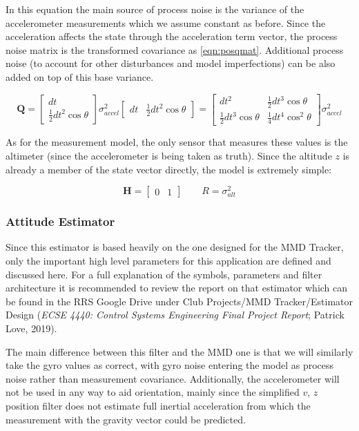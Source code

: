 \documentclass{article}
\renewcommand{\vec}{\boldsymbol} %
\newcommand{\mat}{\vec}
\newcommand{\tvec}[1]{\vec{\tilde{#1}}}
\newcommand{\bmat}[1]{\begin{bmatrix} #1 \end{bmatrix}}
\begin{document}
	In this equation the main source of process noise is the variance of the accelerometer measurements which we assume constant as before.  Since the acceleration affects the state through the acceleration term vector, the process noise matrix is the transformed covariance as \eqref{eqn:posqmat}.  Additional process noise (to account for other disturbances and model imperfections) can be also added on top of this base variance.
	
	\begin{equation}\label{eqn:posqmat}
		\mat{Q} = \bmat{dt\\\frac{1}{2}dt^2\cos\theta} \sigma_{accel}^2 \bmat{dt&\frac{1}{2}dt^2\cos\theta} = \bmat{dt^2&\frac{1}{2}dt^3\cos\theta\\\frac{1}{2}dt^3\cos\theta&\frac{1}{4}dt^4\cos^2\theta}\sigma_{accel}^2
	\end{equation}
	
	As for the measurement model, the only sensor that measures these values is the altimeter (since the accelerometer is being taken as truth).  Since the altitude $z$ is already a member of the state vector directly, the model is extremely simple:
	
	\begin{equation}
		\mat{H} = \bmat{0&1} \qquad R = \sigma_{alt}^2
	\end{equation}
	
	\subsubsection{Attitude Estimator} \def\aerr{\tvec{\theta}}
	
	Since this estimator is based heavily on the one designed for the MMD Tracker, only the important high level parameters for this application are defined and discussed here.  For a full explanation of the symbols, parameters and filter architecture it is recommended to review the report on that estimator which can be found in the RRS Google Drive under Club Projects/MMD Tracker/Estimator Design (\textit{ECSE 4440: Control Systems Engineering Final Project Report}; Patrick Love, 2019).
	
	The main difference between this filter and the MMD one is that we will similarly take the gyro values as correct, with gyro noise entering the model as process noise rather than measurement covariance.  Additionally, the accelerometer will not be used in any way to aid orientation, mainly since the simplified $v$, $z$ position filter does not estimate full inertial acceleration from which the measurement with the gravity vector could be predicted.
	
\end{document}
